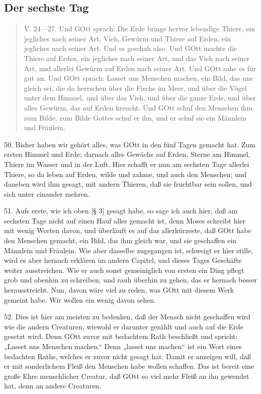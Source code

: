 \subsection{Der sechste Tag}

\begin{quote}
V. 24—27. Und GOtt sprach: Die Erde bringe hervor lebendige Thiere, ein jegliches nach seiner Art, Vieh, Gewürm und Thiere auf Erden, ein jegliches nach seiner Art. Und es geschah also. Und GOtt machte die Thiere auf Erden, ein jegliches nach seiner Art, und das Vieh nach seiner Art, und allerlei Gewürm auf Erden nach seiner Art. Und GOtt sahe es für gut an. Und GOtt sprach: Lasset uns Menschen machen, ein Bild, das uns gleich sei, die da herrschen über die Fische im Meer, und über die Vögel unter dem Himmel, und über das Vieh, und über die ganze Erde, und über alles Gewürm, das auf Erden kreucht. Und GOtt schuf den Menschen ihm zum Bilde, zum Bilde Gottes schuf er ihn, und er schuf sie ein Männlein und Fräulein.
\end{quote}

50. Bisher haben wir gehört alles, was GOtt in den fünf Tagen gemacht hat. Zum ersten Himmel und Erde; darnach alles Gewächs auf Erden, Sterne am Himmel, Thiere im Wasser und in der Luft. Hier schafft er nun am sechsten Tage allerlei Thiere, so da leben auf Erden, wilde und zahme, und auch den Menschen; und daneben wird ihm gesagt, mit andern Thieren, daß sie fruchtbar sein sollen, und sich unter einander mehren.

51. Aufs erste, wie ich oben [§ 3] gesagt habe, so sage ich auch hier, daß am sechsten Tage nicht auf einen Hauf alles gemacht ist, denn Moses schreibt hier mit wenig Worten davon, und überläuft es auf das allerkürzeste, daß GOtt habe den Menschen gemacht, ein Bild, das ihm gleich war, und sie geschaffen ein Männlein und Fräulein. Wie aber dasselbe zugegangen ist, schweigt er hier stille, wird es aber hernach erklären im andern Capitel, und dieses Tages Geschäfte weiter ausstreichen. Wie er auch sonst gemeiniglich von ersten ein Ding pflegt grob und obenhin zu schreiben, und rauh überhin zu gehen, das er hernach besser herausstreicht. Nun, davon wäre viel zu reden, was GOtt mit diesem Werk gemeint habe. Wir wollen ein wenig davon sehen.

52. Dies ist hier am meisten zu bedenken, daß der Mensch nicht geschaffen wird wie die andern Creaturen, wiewohl er darunter gezählt und auch auf die Erde gesetzt wird. Denn GOtt zuvor mit bedachtem Rath beschließt und spricht: „Lasset uns Menschen machen.“ Denn „lasset uns machen“ ist ein Wort eines bedachten Raths, welches er zuvor nicht gesagt hat. Damit er anzeigen will, daß er mit sonderlichem Fleiß den Menschen habe wollen schaffen. Das ist bereit eine große Ehre menschlicher Creatur, daß GOtt so viel mehr Fleiß an ihn gewendet hat, denn an andere Creaturen.

